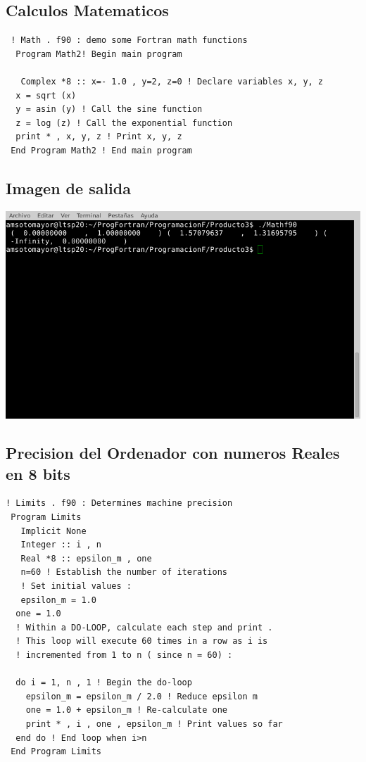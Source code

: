 \documentclass[letterpaper,10pt,twoside,onecolumn]{article}
\begin{document}
\subsection{Calculos Matematicos}
\begin{verbatim} ! Math . f90 : demo some Fortran math functions
  Program Math2! Begin main program

   Complex *8 :: x=- 1.0 , y=2, z=0 ! Declare variables x, y, z
  x = sqrt (x)  
  y = asin (y) ! Call the sine function
  z = log (z) ! Call the exponential function
  print * , x, y, z ! Print x, y, z
 End Program Math2 ! End main program
\end{verbatim}
\subsection{Imagen de salida}
\includegraphics[scale=.75]{Math.png}

\subsection{Precision del Ordenador con numeros Reales en 8 bits}
\begin{verbatim}
! Limits . f90 : Determines machine precision
 Program Limits
   Implicit None
   Integer :: i , n
   Real *8 :: epsilon_m , one
   n=60 ! Establish the number of iterations
   ! Set initial values :
   epsilon_m = 1.0
  one = 1.0
  ! Within a DO-LOOP, calculate each step and print .
  ! This loop will execute 60 times in a row as i is
  ! incremented from 1 to n ( since n = 60) :

  do i = 1, n , 1 ! Begin the do-loop
    epsilon_m = epsilon_m / 2.0 ! Reduce epsilon m
    one = 1.0 + epsilon_m ! Re-calculate one
    print * , i , one , epsilon_m ! Print values so far
  end do ! End loop when i>n
 End Program Limits 
\end{verbatim}
\end{document}
